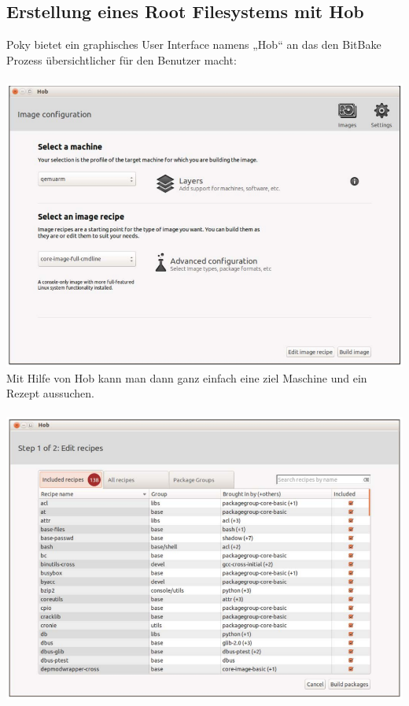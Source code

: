 \documentclass[a4paper,10pt] {article}
\begin{document}
\subsection{Erstellung eines Root Filesystems mit Hob}
Poky bietet ein graphisches User Interface namens „Hob“ an das den BitBake Prozess übersichtlicher für den Benutzer macht:
\\\\
\includegraphics[width=1.0\textwidth]{Hob_Interface}
\\
\newpage
Mit Hilfe von Hob kann man dann ganz einfach eine ziel Maschine und ein Rezept aussuchen.
\\\\
\includegraphics[width=1.0\textwidth]{Hob_Package_1}
\\\\
\end{document}
